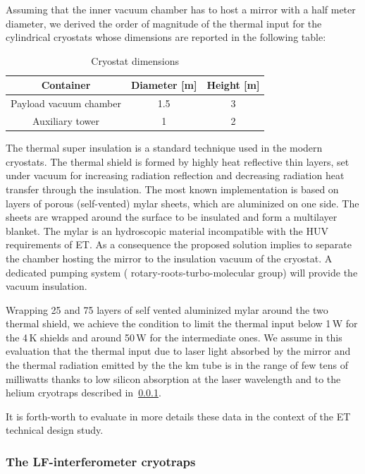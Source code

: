 \noindent
Assuming  that the inner vacuum chamber has to host a mirror with a half meter diameter, we derived the order of magnitude of the thermal input  for the cylindrical cryostats whose dimensions are reported  in the following table:
\begin{table}[htp]
\caption{Cryostat dimensions}
\begin{center}
\begin{tabular}{|c|c|c|}
\hline
\hline
 Container & Diameter [m] & Height [m]\\
\hline
Payload vacuum chamber & 1.5 & 3  \\
Auxiliary tower  & 1 & 2 \\
\hline
\hline
\end{tabular}
\end{center}
\label{tab:cryostat_dimension}
\end{table}

 The thermal super insulation is a standard technique used in the modern cryostats.  The thermal  shield is formed by  highly heat reflective thin layers, set under vacuum  for increasing radiation reflection and decreasing radiation heat transfer through the insulation.  The  most known  implementation   is based on layers  of porous (self-vented) mylar  sheets, which are  aluminized on one side. The sheets are wrapped around the surface to be insulated and  form  a multilayer blanket. 
The mylar is an hydroscopic material incompatible with the HUV requirements of ET. As a consequence the proposed solution implies to  separate the chamber hosting the mirror to the insulation vacuum of the cryostat.   A dedicated pumping system ( rotary-roots-turbo-molecular group) will provide the vacuum insulation.  

Wrapping  25 and 75 layers of self vented aluminized mylar around the two thermal shield, we achieve   the condition to limit the thermal input 
below 1\,W for the 4\,K shields and  around  50\,W for the intermediate ones.
We assume in this evaluation  that the thermal input due to laser light absorbed by the mirror and the thermal radiation emitted by the the km tube is   in the range of few tens of milliwatts  thanks to low silicon absorption at the laser wavelength and to  the helium cryotraps described in~\ref{subsection_helium_cryotraps}. 

It is forth-worth to  evaluate in more details these data in the context of the ET technical design study.  
\FloatBarrier
\subsubsection{The LF-interferometer cryotraps}
\label {subsection_helium_cryotraps}


